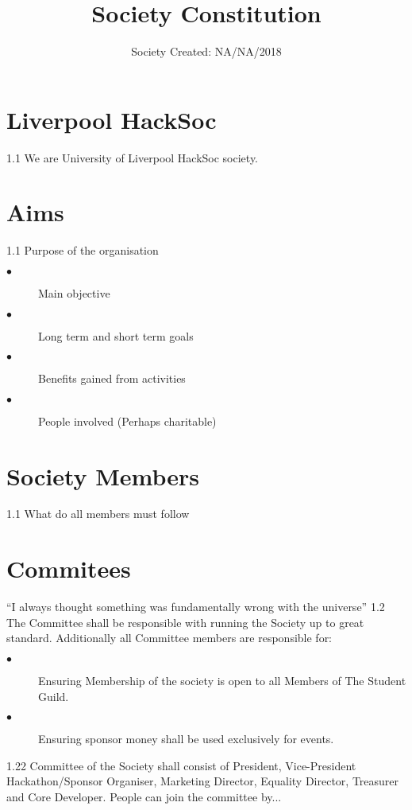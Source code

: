 \documentclass{article}
\title{Society Constitution}
\date{Society Created: NA/NA/2018}
\begin{document}
\maketitle

\section{Liverpool HackSoc}
1.1 We are University of Liverpool HackSoc society. 

\section{Aims}
1.1 Purpose of the organisation

\begin{description}
  \item[$\bullet$] Main objective
  \item[$\bullet$] Long term and short term goals
  \item[$\bullet$] Benefits gained from activities
  \item[$\bullet$] People involved (Perhaps charitable)
\end{description}

\section{Society Members}
1.1 What do all members must follow

\section{Commitees}
``I always thought something was fundamentally wrong with the universe'' \citep{adams1995hitchhiker}
1.2 The Committee shall be responsible with running the Society up to great standard. Additionally all Committee members are responsible for:

\begin{description}
  \item[$\bullet$]Ensuring Membership of the society is open to all Members of The Student Guild.
  \item[$\bullet$]Ensuring sponsor money shall be used exclusively for events.
\end{description}

1.22 Committee of the Society shall consist of President, Vice-President Hackathon/Sponsor Organiser, Marketing Director, Equality Director, Treasurer and Core Developer. People can join the committee by...
\end{document}

